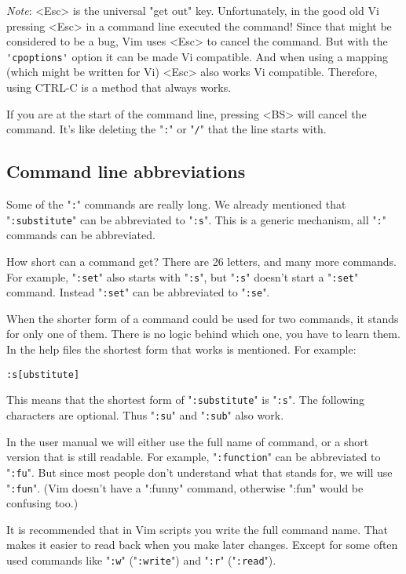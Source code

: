 \emph{Note}:
<Esc> is the universal "get out" key.
Unfortunately, in the good old Vi pressing <Esc> in a command line executed the command!
Since that might be considered to be a bug, Vim uses <Esc> to cancel the command.
But with the \verb!'cpoptions'! option it can be made Vi compatible.
And when using a mapping (which might be written for Vi) <Esc> also works Vi compatible.
Therefore, using CTRL-C is a method that always works.

If you are at the start of the command line, pressing <BS> will cancel the command.
It's like deleting the "\verb!:!" or "\verb!/!" that the line starts with.
\subsection{Command line abbreviations}
Some of the "\verb!:!" commands are really long.
We already mentioned that "\verb!:substitute!" can be abbreviated to "\verb!:s!".
This is a generic mechanism, all "\verb!:!" commands can be abbreviated.

How short can a command get?  There are 26 letters, and many more commands.
For example, "\verb!:set!" also starts with "\verb!:s!", but "\verb!:s!" doesn't start a "\verb!:set!" command.
Instead "\verb!:set!" can be abbreviated to "\verb!:se!".

When the shorter form of a command could be used for two commands, it stands for only one of them.
There is no logic behind which one, you have to learn them.
In the help files the shortest form that works is mentioned.
For example:

\begin{Verbatim}[samepage=true]
 :s[ubstitute]
\end{Verbatim}

This means that the shortest form of "\verb!:substitute!" is "\verb!:s!".
The following characters are optional.
Thus "\verb!:su!" and "\verb!:sub!" also work.

In the user manual we will either use the full name of command, or a short version that is still readable.
For example, "\verb!:function!" can be abbreviated to "\verb!:fu!".
But since most people don't understand what that stands for, we will use "\verb!:fun!".
(Vim doesn't have a ":funny" command, otherwise ":fun" would be confusing too.)

It is recommended that in Vim scripts you write the full command name.
That makes it easier to read back when you make later changes.
Except for some often used commands like "\verb!:w!" ("\verb!:write!") and "\verb!:r!" ("\verb!:read!").

